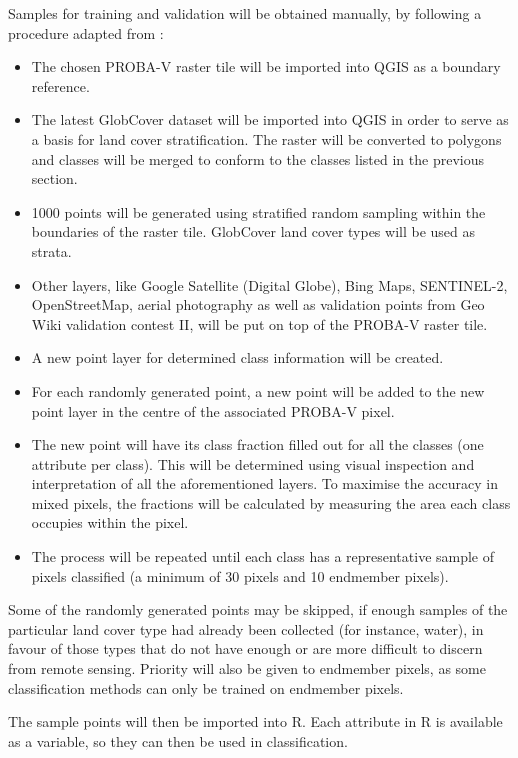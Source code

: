 \documentclass[a4paper,10pt]{article}
\begin{document}
Samples for training and validation will be obtained manually, by following a procedure adapted from \cite{defries1998training}:
\begin{itemize}
 \item The chosen PROBA-V raster tile will be imported into QGIS as a boundary reference.
 \item The latest GlobCover dataset will be imported into QGIS in order to serve as a basis for land cover stratification. The raster will be converted to polygons and classes will be merged to conform to the classes listed in the previous section.
 \item 1000 points will be generated using stratified random sampling within the boundaries of the raster tile. GlobCover land cover types will be used as strata.
 \item Other layers, like Google Satellite (Digital Globe), Bing Maps, SENTINEL-2, OpenStreetMap, aerial photography as well as validation points from Geo Wiki validation contest II, will be put on top of the PROBA-V raster tile.
 \item A new point layer for determined class information will be created.
 \item For each randomly generated point, a new point will be added to the new point layer in the centre of the associated PROBA-V pixel.
 \item The new point will have its class fraction filled out for all the classes (one attribute per class). This will be determined using visual inspection and interpretation of all the aforementioned layers. To maximise the accuracy in mixed pixels, the fractions will be calculated by measuring the area each class occupies within the pixel.
 \item The process will be repeated until each class has a representative sample of pixels classified (a minimum of 30 pixels and 10 endmember pixels).
\end{itemize}

Some of the randomly generated points may be skipped, if enough samples of the particular land cover type had already been collected (for instance, water), in favour of those types that do not have enough or are more difficult to discern from remote sensing. Priority will also be given to endmember pixels, as some classification methods can only be trained on endmember pixels.

The sample points will then be imported into R. Each attribute in R is available as a variable, so they can then be used in classification.
\end{document}

